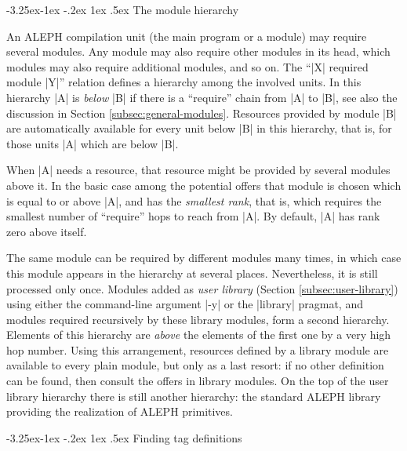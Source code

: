 \documentclass[titlepage]{article}
\makeatletter
\newcommand\A{\textsf{ALEPH}}
\renewcommand\subsection{%
\@startsection{subsection}{2}{\z@}%
   {-3.25ex\@plus -1ex \@minus -.2ex}%
   {1ex \@plus .5ex}%
   {\normalfont\normalsize\bfseries}}
\makeatother
\begin{document}

\subsection{The module hierarchy}\label{subsec:hierarchy}

An \A{} compilation unit (the main program or a module) may require several
modules. Any module may also require other modules in its head, which
modules may also require additional modules, and so on. The ``\pp|X|
required module \pp|Y|'' relation defines a hierarchy among the involved
units. In this hierarchy \pp|A| is \emph{below} \pp|B| if there is a
``require'' chain from \pp|A| to \pp|B|, see also the discussion in Section
\ref{subsec:general-modules}. Resources provided by module \pp|B| are
automatically available for every unit below \pp|B| in this hierarchy, that
is, for those units \pp|A| which are below \pp|B|.

When \pp|A| needs a resource, that resource might be provided by several
modules above it. In the basic case among the potential offers that module is chosen
which is equal to or above \pp|A|, and has the \emph{smallest rank}, that
is, which requires the smallest number of ``require'' hops to reach from
\pp|A|. By default, \pp|A| has rank zero above itself.

The same module can be required by different modules many times, in which
case this module appears in the hierarchy at several places. Nevertheless,
it is still processed only once. Modules added as \emph{user library}
(Section \ref{subsec:user-library}) using either the command-line argument
\pp|-y| or the \pp|library| pragmat, and modules required recursively by
these library modules, form a second hierarchy. Elements of this hierarchy
are \emph{above} the elements of the first one by a very high hop number.
Using this arrangement, resources defined by a library module are available
to every plain module, but only as a last resort: if no other definition can
be found, then consult the offers in library modules. On the top of the user
library hierarchy there is still another hierarchy: the standard \A{}
library providing the realization of \A{} primitives.


\subsection{Finding tag definitions}\label{subsec:qualifier}
\end{document}
